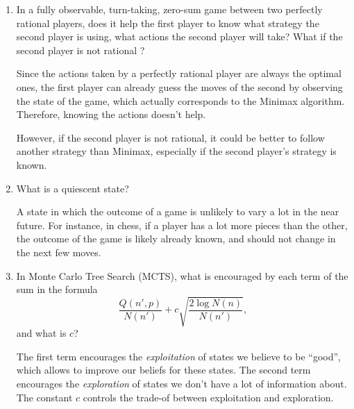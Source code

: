 \documentclass[11pt, a4paper]{article}
\begin{document}
\begin{enumerate}
    \item In a fully observable, turn-taking, zero-sum game between two perfectly rational players, does it help the first player to know what strategy the second player is using, \ie{} what actions the second player will take? What if the second player is not rational ?
    
    \begin{solution}
        Since the actions taken by a perfectly rational player are always the optimal ones, the first player can already guess the moves of the second by observing the state of the game, which actually corresponds to the Minimax algorithm. Therefore, knowing the actions doesn't help.
        
        However, if the second player is not rational, it could be better to follow another strategy than Minimax, especially if the second player's strategy is known.
    \end{solution}
    
    \item What is a quiescent state?
    
    \begin{solution}
        A state in which the outcome of a game is unlikely to vary a lot in the near future. For instance, in chess, if a player has a lot more pieces than the other, the outcome of the game is likely already known, and should not change in the next few moves.
    \end{solution}
    
    \item In Monte Carlo Tree Search (MCTS), what is encouraged by each term of the sum in the formula
    \begin{equation*}
        \frac{Q(n', p)}{N(n')} + c \sqrt{\frac{2 \log N(n)}{N(n')}},
    \end{equation*}
    and what is $c$?
    
    \begin{solution}
        The first term encourages the \emph{exploitation} of states we believe to be \enquote{good}, which allows to improve our beliefs for these states. The second term encourages the \emph{exploration} of states we don't have a lot of information about. The constant $c$ controls the trade-of between exploitation and exploration.
    \end{solution}
\end{enumerate}

\newpage
\end{document}
